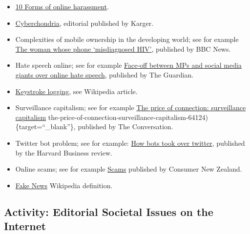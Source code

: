 \documentclass[
]{book}
\providecommand{\tightlist}{%
  \setlength{\itemsep}{0pt}\setlength{\parskip}{0pt}}
\theoremstyle{definition}
\theoremstyle{definition}
\theoremstyle{definition}
\theoremstyle{definition}
\theoremstyle{remark}
\begin{document}
\begin{itemize}
\tightlist
\item
  \href{https://computer.howstuffworks.com/10-forms-online-harassment.htm}{10 Forms of online harassment}.\\
\item
  \href{https://karger.com/pps/article/86/3/129/282998/Cyberchondria-Challenges-of-Problematic-Online}{Cyberchondria}, editorial published by Karger.\\
\item
  Complexities of mobile ownership in the developing world; see for example \href{https://www.bbc.com/news/technology-39371100}{The woman whose phone `misdiagnosed HIV'}, published by BBC News.\\
\item
  Hate speech online; see for example \href{https://www.theguardian.com/media/2017/mar/14/face-off-mps-and-social-media-giants-online-hate-speech-facebook-twitter}{Face-off between MPs and social media giants over online hate speech}, published by The Guardian.\\
\item
  \href{https://en.wikipedia.org/wiki/Keystroke_logging}{Keystroke logging}, see Wikipedia article.\\
\item
  Surveillance capitalism; see for example \href{https://theconversation.com/}{The price of connection: surveillance capitalism} the-price-of-connection-surveillance-capitalism-64124)\{target=``\_blank''\}, published by The Conversation.\\
\item
  Twitter bot problem; see for example: \href{https://hbr.org/2015/06/how-bots-took-over-twitter}{How bots took over twitter}, published by the Harvard Business review.\\
\item
  Online scams; see for example \href{https://www.consumer.org.nz/articles/scams?gclid=EAIaIQobChMIrOzE7qX71AIVxBiPCh0uzAKrEAAYASAAEgIXf_D_BwE}{Scams} published by Consumer New Zealand.\\
\item
  \href{https://en.wikipedia.org/wiki/Fake_news}{Fake News} Wikipedia definition.
\end{itemize}

\hypertarget{activity-editorial-societal-issues-on-the-internet}{%
\subsection*{Activity: Editorial Societal Issues on the Internet}\label{activity-editorial-societal-issues-on-the-internet}}
\end{document}
